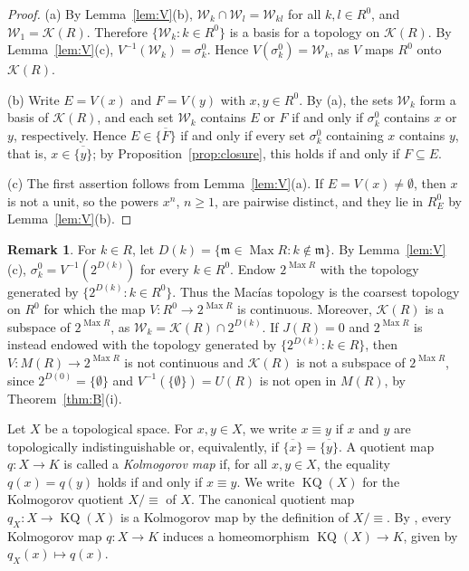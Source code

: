 \documentclass[12pt,reqno,a4paper]{amsart}
\newcommand{\K}{\mathcal{K}}
\newcommand{\W}{\mathcal{W}}
\newcommand{\m}{\mathfrak{m}}
\newcommand{\clo}[1]{\overline{\{#1\}}}
\DeclareMathOperator{\Max}{Max}
\theoremstyle{plain}
\theoremstyle{definition}
\newtheorem{remark}[theorem]{Remark}
\begin{document}
\begin{proof}
(a) By Lemma~\ref{lem:V}(b), $\W_k\cap\W_l=\W_{kl}$ for all $k,l\in R^0$, and $\W_1=\K(R)$. Therefore $\{\W_k:k\in R^0\}$ is a basis for a topology on $\K(R)$. By Lemma~\ref{lem:V}(c), $V^{-1}(\W_k)=\sigma_k^0$. Hence $V(\sigma_k^0)=\W_k$, as $V$ maps $R^0$ onto $\K(R)$.

(b) Write $E=V(x)$ and $F=V(y)$ with $x,y\in R^0$. By (a), the sets $\W_k$ form a basis of $\K(R)$, and each set $\W_k$ contains $E$ or $F$ if and only if $\sigma_k^0$ contains $x$ or $y$, respectively. Hence $E\in\clo{F}$ if and only if every set $\sigma_k^0$ containing $x$ contains $y$, that is, $x\in\clo{y}$; by Proposition~\ref{prop:closure}, this holds if and only if $F\subseteq E$.

(c) The first assertion follows from Lemma~\ref{lem:V}(a). If $E=V(x)\neq\emptyset$, then $x$ is not a unit, so the powers $x^n$, $n\geq1$, are pairwise distinct, and they lie in $R^0_E$ by Lemma~\ref{lem:V}(b).
\end{proof}
\begin{remark}\label{rem:kolmogorov}
For $k\in R$, let $D(k)=\{\m\in\Max R:k\notin\m\}$. By Lemma~\ref{lem:V}(c), $\sigma_k^0=V^{-1}(2^{D(k)})$ for every $k\in R^0$. Endow $2^{\Max R}$ with the topology generated by $\{2^{D(k)}:k\in R^0\}$. Thus the Mac\'ias topology is the coarsest topology on $R^0$ for which the map $V\colon R^0\to2^{\Max R}$ is continuous. Moreover, $\K(R)$ is a subspace of $2^{\Max R}$, as $\W_k=\K(R)\cap2^{D(k)}$. If $J(R)=0$ and $2^{\Max R}$ is instead endowed with the topology generated by $\{2^{D(k)}:k\in R\}$, then $V\colon M(R)\to2^{\Max R}$ is not continuous and $\K(R)$ is not a subspace of $2^{\Max R}$, since $2^{D(0)}=\{\emptyset\}$ and $V^{-1}(\{\emptyset\})=U(R)$ is not open in $M(R)$, by Theorem~\ref{thm:B}(i).
\end{remark}

Let $X$ be a topological space. For $x,y\in X$, we write $x\equiv y$ if $x$ and $y$ are topologically indistinguishable or, equivalently, if $\clo{x}=\clo{y}$. A quotient map $q\colon X\to K$ is called a \emph{Kolmogorov map} if, for all $x,y\in X$, the equality $q(x)=q(y)$ holds if and only if $x\equiv y$. We write $\operatorname{KQ}(X)$ for the Kolmogorov quotient $X/{\equiv}$ of $X$. The canonical quotient map $q_X\colon X\to\operatorname{KQ}(X)$ is a Kolmogorov map by the definition of $X/{\equiv}$. By \cite[Corollary~22.3]{Munkres}, every Kolmogorov map $q\colon X\to K$ induces a homeomorphism $\operatorname{KQ}(X)\to K$, given by $q_X(x)\mapsto q(x)$.
\end{document}
